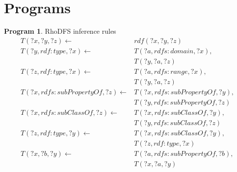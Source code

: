 \documentclass[sigconf,screen,review=false,natbib]{acmart}
\theoremstyle{definition}
\newtheorem{prog}{Program}[section]
\begin{document}
\section{Programs}
\begin{prog}{RhoDFS inference rules}
	\begin{align*}
		T(?x, ?y, ?z) \leftarrow                 & rdf(?x, ?y, ?z)                \\
		T(?y, rdf:type, ?x) \leftarrow           & T(?a, rdfs:domain, ?x),        \\
		                                         & T(?y, ?a, ?z)                  \\
		T(?z, rdf:type, ?x) \leftarrow           & T(?a, rdfs:range, ?x),         \\
		                                         & T(?y, ?a, ?z)                  \\
		T(?x, rdfs:subPropertyOf, ?z) \leftarrow & T(?x, rdfs:subPropertyOf, ?y), \\
		                                         & T(?y, rdfs:subPropertyOf, ?z)  \\
		T(?x, rdfs:subClassOf, ?z) \leftarrow    & T(?x, rdfs:subClassOf, ?y),    \\
		                                         & T(?y, rdfs:subClassOf, ?z)     \\
		T(?z, rdf:type, ?y) \leftarrow           & T(?x, rdfs:subClassOf, ?y),    \\
		                                         & T(?z, rdf:type, ?x)            \\
		T(?x, ?b, ?y) \leftarrow                 & T(?a, rdfs:subPropertyOf, ?b), \\
		                                         & T(?x, ?a, ?y)
	\end{align*}
	\label{program:rhodfs}
\end{prog}
\end{document}
